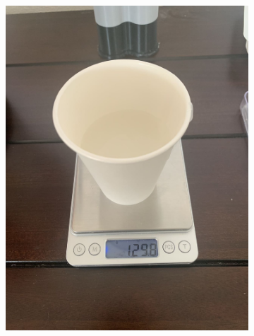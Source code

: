 \documentclass[twoside]{article}
\begin{document}
\begin{figure}[H]
\begin{subfigure}[b]{0.33\linewidth}
		\includegraphics[width=\textwidth]{part b}
	\end{subfigure}
	

\end{figure}
\end{document}
